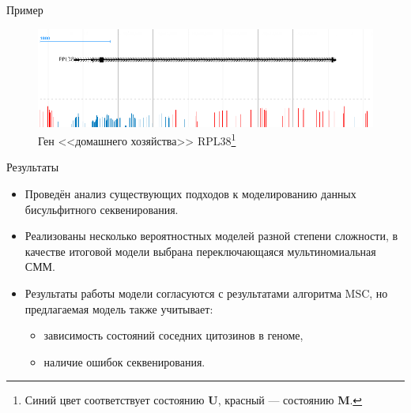\documentclass[unicode,mathserif]{beamer}
\begin{document}
\begin{frame}{Пример}
  \begin{figure}
    \centering
    \includegraphics[width=\textwidth]{images/RPL38}
    \caption{Ген <<домашнего хозяйства>> RPL38\footnote{Синий цвет соответствует состоянию \textbf{U},
      красный --- состоянию \textbf{M}.}}
  \end{figure}
\end{frame}


\begin{frame}{Результаты}
  \begin{itemize}
  \item Проведён анализ существующих подходов к моделированию данных бисульфитного
    секвенирования.
  \item Реализованы несколько вероятностных моделей разной степени сложности,
    в качестве итоговой модели выбрана переключающаяся мультиномиальная СММ.
  \item Результаты работы модели согласуются с результатами алгоритма MSC,
    но предлагаемая модель также учитывает:
    \begin{itemize}
    \item зависимость состояний соседних цитозинов в геноме,
    \item наличие ошибок секвенирования.
    \end{itemize}
  \end{itemize}
\end{frame}
\end{document}
